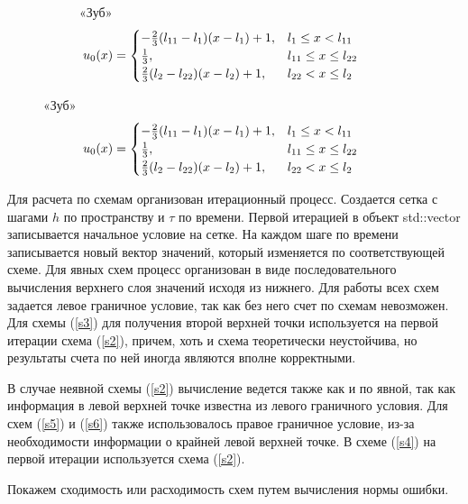 \documentclass[12pt, a4paper]{article}
\begin{document}
\begin{figure}[!hp]
\begin{subfigure}[t]{0.475\textwidth}
		\captionsetup{singlelinecheck=off}
		\caption[]{«Зуб»
			\[
			\hspace*{-0.75cm}u_0(x) =
			\begin{cases}
				-\frac{2}{3} (l_{11} - l_1) (x - l_1) + 1, & l_1 \leq x < l_{11} \\
				\frac{1}{3}, & l_{11} \leq x \leq l_{22} \\
				\frac{2}{3} (l_2 - l_{22}) (x - l_2) + 1, & l_{22} < x \leq l_2
			\end{cases}
			\]
		}
		\label{test5}
	\end{subfigure}
\end{figure}
\clearpage

 Для расчета по схемам организован итерационный процесс. Создается сетка с шагами $h$ по пространству и $\tau$ по времени. Первой итерацией в объект std::vector записывается начальное условие на сетке. На каждом шаге по времени записывается новый вектор значений, который изменяется по соответствующей схеме. Для явных схем процесс организован в виде последовательного вычисления верхнего слоя значений исходя из нижнего. Для работы всех схем задается левое граничное условие, так как без него счет по схемам невозможен. Для схемы (\ref{s3}) для получения второй верхней точки используется на первой итерации схема (\ref{s2}), причем, хоть и схема теоретически неустойчива, но результаты счета по ней иногда являются вполне корректными.
 
 В случае неявной схемы (\ref{s2}) вычисление ведется также как и по явной, так как информация в левой верхней точке известна из левого граничного условия. Для схем (\ref{s5}) и (\ref{s6}) также использовалось правое граничное условие, из-за необходимости информации о крайней левой верхней точке. В схеме (\ref{s4}) на первой итерации используется  схема (\ref{s2}).
 
Покажем сходимость или расходимость схем путем вычисления нормы ошибки.

\end{document}
